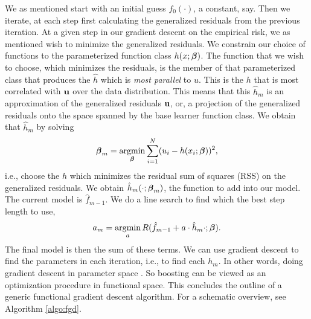 We as mentioned start with an initial guess $f_0(\cdot)$, a constant, say. Then we iterate, at each step first calculating the generalized residuals from the previous iteration. At a given step in our gradient descent on the empirical risk, we as mentioned wish to minimize the generalized residuals. We constrain our choice of functions to the parameterized function class $h(x;\boldsymbol{\beta})$. The function that we wish to choose, which minimizes the residuals, is the member of that parameterized class that produces the $\hat{h}$ which is \textit{most parallel} to $u$. This is the $h$ that is most correlated with $\mathbf{u}$ over the data distribution. This means that this $\hat{h}_m$ is an approximation of the generalized residuals $\mathbf{u}$, or, a projection of the generalized residuals onto the space spanned by the base learner function class. We obtain that $\hat{h}_m$ by solving
\begin{equation}
    \boldsymbol{\beta}_m=\operatorname*{argmin}_{\boldsymbol{\beta}} \sum_{i=1}^N (u_i-h(x_i;\boldsymbol{\beta}))^2,
\end{equation}
i.e., choose the $h$ which minimizes the residual sum of squares (RSS) on the generalized residuals. We obtain $\hat{h}_m(\cdot;\boldsymbol{\beta}_m)$, the function to add into our model. The current model is $\hat{f}_{m-1}$. We do a line search to find which the best step length to use,
\begin{equation*}
    a_m=\operatorname*{argmin}_{a}R(\hat{f}_{m-1}+a\cdot\hat{h}_m{\cdot;\boldsymbol{\beta}}).
\end{equation*}
The final model is then the sum of these terms. We can use gradient descent to find the parameters in each iteration, i.e., to find each $h_m$. In other words, doing gradient descent in parameter space \citep{friedman2001}. So boosting can be viewed as an optimization procedure in functional space. This concludes the outline of a generic functional gradient descent algorithm. For a schematic overview, see Algorithm \ref{algo:fgd}.
